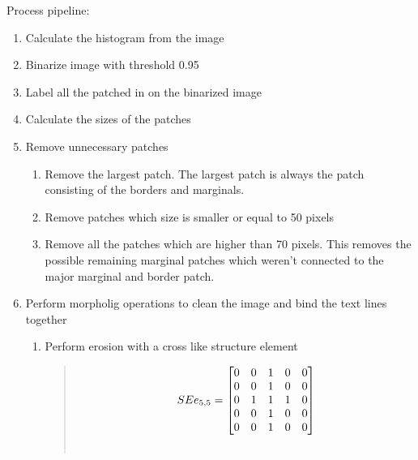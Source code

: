 \documentclass[letterpaper,10pt,english]{sphinxmanual}
\begin{document}
\begin{fulllineitems}
\begin{fulllineitems}
Process pipeline:
\begin{enumerate}
\item {} 
Calculate the histogram from the image

\item {} 
Binarize image with threshold 0.95

\item {} 
Label all the patched in on the binarized image

\item {} 
Calculate the sizes of the patches

\item {} 
Remove unnecessary patches
\begin{enumerate}
\item {} 
Remove the largest patch. The largest patch is always the patch consisting of the borders and marginals.

\item {} 
Remove patches which size is smaller or equal to 50 pixels

\item {} 
Remove all the patches which are higher than 70 pixels. This removes the possible remaining marginal patches which weren't connected to the major marginal and border patch.

\end{enumerate}

\item {} 
Perform morpholig operations to clean the image and bind the text lines together
\begin{enumerate}
\item {} 
Perform erosion with a cross like structure element
\begin{quote}
\begin{gather}
\begin{split}SEe_{5,5} = 
\begin{bmatrix}
        0 & 0 & 1 & 0 & 0 \\
        0 & 0 & 1 & 0 & 0 \\
        0 & 1 & 1 & 1 & 0 \\
        0 & 0 & 1 & 0 & 0 \\
        0 & 0 & 1 & 0 & 0
\end{bmatrix}\end{split}\notag\\\begin{split}\end{split}\notag
\end{gather}\end{quote}


\end{enumerate}
\end{enumerate}
\end{fulllineitems}
\end{fulllineitems}
\end{document}
